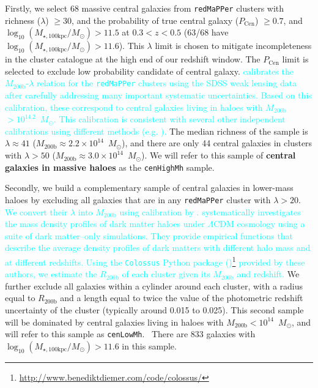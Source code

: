 \documentclass[a4paper,fleqn,usenatbib]{mnras}
\def\msun{$M_\odot$}
\def\redm{\texttt{redMaPPer}}
\def\rbcg{\texttt{cenHighMh}}
\def\nbcg{\texttt{cenLowMh}}
\def\mstar{{$M_{\star}$}}
\def\mhalo{{$M_{\mathrm{200b}}$}}
\def\logmtot{{$\log_{10} (M_{\star,100\mathrm{kpc}}/M_{\odot})$}}
\newcommand{\song}[1]{\textcolor{cyan}{#1}}
\begin{document}
 
    Firstly, we select 68 massive central galaxies from \redm{} clusters 
    with richness ($\lambda$) $\geq 30$, and the probability of true central galaxy 
    ($P_{\mathrm{Cen}}$) $\geq 0.7$, and \logmtot{}$>11.5$ 
    at $0.3 < z < 0.5$ (63/68 have \logmtot{}$>11.6$). 
    This $\lambda$ limit is chosen to mitigate incompleteness in the cluster catalogue
    at the high end of our redshift window. 
    The $P_{\mathrm{Cen}}$ limit is selected to exclude low probability candidate of 
    central galaxy. 
    \song{
    \citet{Simet2017} calibrates the \mhalo{}-$\lambda$ relation for the \redm{} 
    clusters using the SDSS weak lensing data after carefully addressing many 
    important systematic uncertainties.
    Based on this calibration, these correspond to central galaxies living in haloes 
    with \mhalo{}$>10^{14.2}$~\msun{}. 
    This calibration is consistent with several other independent calibrations 
    using different methods (e.g. \citealt{Saro2015, Farahi2016, 
    Melchior2016, Murata2017}). 
    }
    The median richness of the sample is $\lambda \approx 41$ 
    (\mhalo{}$\approx 2.2 \times 10^{14}$~\msun{}), and there are 
    only 44 central galaxies in clusters with $\lambda>50$ 
    (\mhalo{}$\approx 3.0 \times 10^{14}$~\msun{}).
    We will refer to this sample of \textbf{central galaxies in massive haloes} as 
    the \rbcg{} sample.
    
    Secondly, we build a complementary sample of central galaxies in lower-mass haloes
    by excluding all galaxies that are in any \redm{} cluster with $\lambda > 20$.
    \song{
    We convert their $\lambda$ into $M_{\mathrm{200b}}$ using calibration by 
    \citet{Simet2017}. 
    \citet{Diemer2015} systematically investigates the mass density profiles of 
    dark matter haloes under $\Lambda$CDM cosmology using a suite of dark matter--only
    simulations.  
    They provide empirical functions that describe the average density profiles 
    of dark matters with different halo mass and at different redshifts.  
    Using the \texttt{Colossus} Python package 
    (\citealt{Colossus})\footnote{\url{http://www.benediktdiemer.com/code/colossus/}}
    provided by these authors, we estimate the $R_{\mathrm{200b}}$ of each cluster 
    given its $M_{\mathrm{200b}}$ and redshift.
    } 
    We further exclude all galaxies within a cylinder around each cluster, with a radius
    equal to $R_{\mathrm{200b}}$ and a length equal to twice the value of the 
    photometric redshift uncertainty of the cluster (typically around 0.015 to 0.025).
    This second sample will be dominated by central galaxies living in haloes with
    $M_{\mathrm{200b}} < 10^{14}$~\msun{}, and will refer to this sample as \nbcg{}. \
    There are 833 galaxies with \logmtot{}$> 11.6$ in this sample.
\end{document}
